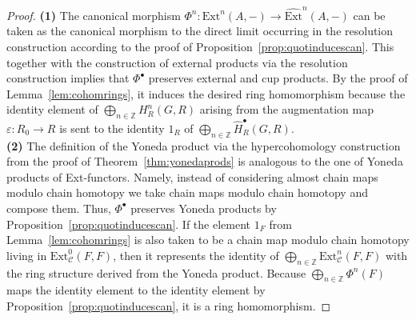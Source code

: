 \documentclass[12pt, a4paper]{article}
\numberwithin{equation}{section}
\theoremstyle{empty}
\theoremstyle{nonumberplain}
\newtheorem{proof}{Proof}
\begin{document}
\begin{proof}
\textbf{(1)} The canonical morphism $\Phi^n: \mathrm{Ext}^n(A, -) \rightarrow \widehat{\mathrm{Ext}}^n(A, -)$ can be taken as the canonical morphism to the direct limit occurring in the resolution construction according to the proof of Proposition~\ref{prop:quotinducescan}. This together with the construction of external products via the resolution construction implies that $\Phi^{\bullet}$ preserves external and cup products. By the proof of Lemma~\ref{lem:cohomrings}, it induces the desired ring homomorphism because the identity element of $\bigoplus_{n \in \mathbb{Z}} H_R^n(G, R)$ arising from the augmentation map $\varepsilon: R_0 \rightarrow R$ is sent to the identity $1_R$ of $\bigoplus_{n \in \mathbb{Z}} \widehat{H}_R^{\bullet}(G, R)$. \\

\textbf{(2)} The definition of the Yoneda product via the hypercohomology construction from the proof of Theorem~\ref{thm:yonedaprods} is analogous to the one of Yoneda products of Ext-functors. Namely, instead of considering almost chain maps modulo chain homotopy we take chain maps modulo chain homotopy and compose them. Thus, $\Phi^{\bullet}$ preserves Yoneda products by Proposition~\ref{prop:quotinducescan}. If the element $1_F$ from Lemma~\ref{lem:cohomrings} is also taken to be a chain map modulo chain homotopy living in $\mathrm{Ext}_{\mathcal{C}}^0(F, F)$, then it represents the identity of $\bigoplus_{n \in \mathbb{Z}} \mathrm{Ext}_{\mathcal{C}}^n(F, F)$ with the ring structure derived from the Yoneda product. Because $\bigoplus_{n \in \mathbb{Z}} \Phi^n(F)$ maps the identity element to the identity element by Proposition~\ref{prop:quotinducescan}, it is a ring homomorphism.
\end{proof}
\end{document}
